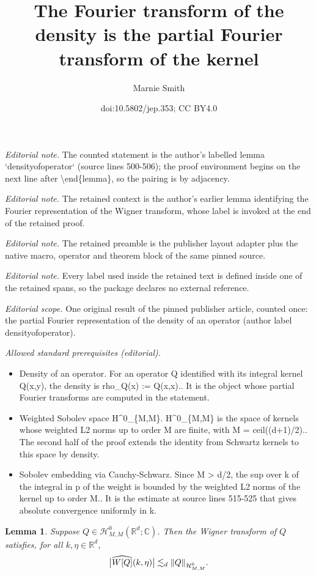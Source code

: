\documentclass[10pt,a4paper]{article}
\title{The Fourier transform of the density is the partial Fourier transform of the kernel}
\author{Marnie Smith}
\date{doi:10.5802/jep.353; CC BY4.0}
\newcommand{\babs}[1]{\bigl|#1\bigr|}
\theoremstyle{plain}
\newtheorem{lemma}[theorem]{Lemma}
\theoremstyle{remark}
\newcommand{\R}{\mathbb{R}}
\newcommand{\C}{\mathbb{C}}
\begin{document}
\maketitle
\noindent\textit{Editorial note.} The counted statement is the author's labelled lemma `densityofoperator` (source lines 500-506); the proof environment begins on the next line after \textbackslash{}end\{lemma\}, so the pairing is by adjacency.\par\medskip
\noindent\textit{Editorial note.} The retained context is the author's earlier lemma identifying the Fourier representation of the Wigner transform, whose label is invoked at the end of the retained proof.\par\medskip
\noindent\textit{Editorial note.} The retained preamble is the publisher layout adapter plus the native macro, operator and theorem block of the same pinned source.\par\medskip
\noindent\textit{Editorial note.} Every label used inside the retained text is defined inside one of the retained spans, so the package declares no external reference.\par\medskip
\noindent\textit{Editorial scope.} One original result of the pinned publisher article, counted once: the partial Fourier representation of the density of an operator (author label densityofoperator).\par\medskip
\noindent\textit{Allowed standard prerequisites (editorial).}\begin{itemize}
\item Density of an operator. For an operator Q identified with its integral kernel Q(x,y), the density is rho\_Q(x) := Q(x,x).. It is the object whose partial Fourier transforms are computed in the statement.
\item Weighted Sobolev space H\textasciicircum{}0\_\{M,M\}. H\textasciicircum{}0\_\{M,M\} is the space of kernels whose weighted L2 norms up to order M are finite, with M = ceil((d+1)/2).. The second half of the proof extends the identity from Schwartz kernels to this space by density.
\item Sobolev embedding via Cauchy-Schwarz. Since M > d/2, the sup over k of the integral in p of the weight is bounded by the weighted L2 norms of the kernel up to order M.. It is the estimate at source lines 515-525 that gives absolute convergence uniformly in k.
\end{itemize}\medskip
\begin{lemma}\label{FTofWignertransform}
Suppose $Q\in\mathcal H^0_{M,M}(\R^d;\C)$. Then the Wigner transform of $Q$ satisfies, for all $k,\eta\in\R^d$,
\begin{align*}
\babs{\widehat {W[Q]}(k,\eta)}\lesssim_d\norm{Q}_{\mathcal H^{0}_{M,M}}.
\end{align*}
\end{lemma}
\end{document}
